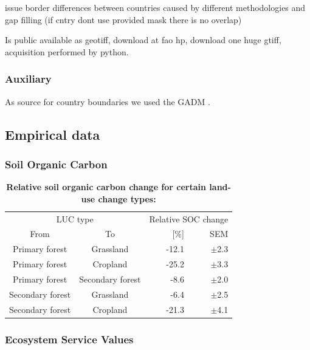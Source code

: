 			issue border differences between countries caused by different methodologies and gap filling (if cntry dont use provided mask there is no overlap)

			Is public available as geotiff, download at fao hp, download one huge gtiff, acquisition performed by python.

		\subsubsection{Auxiliary}
			As source for country boundaries we used the \ac{GADM} \citep{Hijmans2018}.

	\subsection{Empirical data}
		\subsubsection{Soil Organic Carbon}
			\begin{table}[ht]
				\centering
				\caption[Relative soil organic carbon change for certain land-use change types]{\textbf{Relative soil organic carbon change for certain land-use change types:} \citep{Don2010}}
				\label{tab:soc}
				\begin{tabular}{ccrr}
					\hline
					\multicolumn{2}{c}{LUC type} & \multicolumn{2}{c}{Relative SOC change} \\
					From & To & [\%] & SEM \\\hline
					Primary forest & Grassland & -12.1 & $\pm$2.3 \\
					Primary forest & Cropland & -25.2 & $\pm$3.3 \\
					Primary forest & Secondary forest & -8.6 & $\pm$2.0 \\
					Secondary forest & Grassland & -6.4 & $\pm$2.5 \\
					Secondary forest & Cropland & -21.3 & $\pm$4.1 \\\hline
				\end{tabular}
			\end{table}

		\subsubsection{Ecosystem Service Values}


